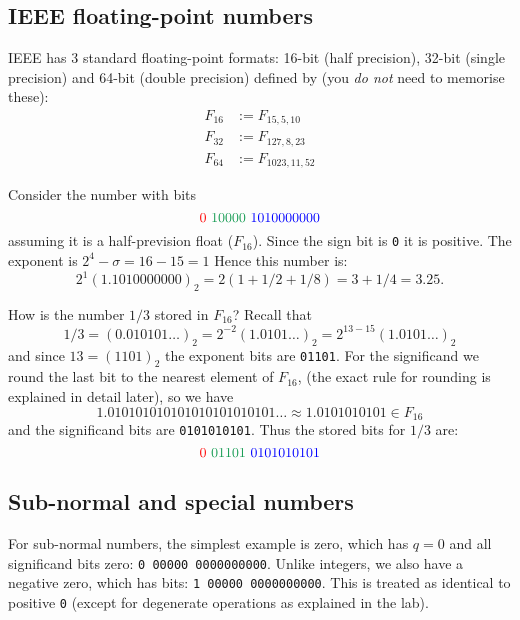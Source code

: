 \subsection{IEEE floating-point numbers}
\begin{definition}  IEEE has 3 standard floating-point formats: 16-bit (half precision), 32-bit (single precision) and 64-bit (double precision) defined by (you \emph{do not} need to memorise these):
\begin{align*}
F_{16} &:= F_{15,5,10} \\
F_{32} &:= F_{127,8,23} \\
F_{64} &:= F_{1023,11,52}
\end{align*}
\end{definition}

\begin{example} Consider the number with bits
\[
\red{0}\ \green{10000}\ \blue{1010000000}
\]
assuming it is a half-prevision float ($F_{16}$).  Since the sign bit is \texttt{0} it is positive. The exponent is $2^4 - \ensuremath{\sigma} = 16 - 15 = 1$ Hence this number is:
\[
2^1 (1.1010000000)_2 = 2 (1 + 1/2 + 1/8) = 3+1/4 = 3.25.
\]
\end{example}

\begin{example} How is the number $1/3$ stored in $F_{16}$? Recall that
\[
1/3 = (0.010101\ensuremath{\ldots})_2 = 2^{-2} (1.0101\ensuremath{\ldots})_2 = 2^{13-15} (1.0101\ensuremath{\ldots})_2
\]
and since $13 = (1101)_2$  the exponent bits are \texttt{01101}. For the significand we round the last bit to the nearest element of $F_{16}$,  (the exact rule for rounding is explained in detail later), so we have
\[
1.010101010101010101010101\ensuremath{\ldots}\approx 1.0101010101 \in F_{16} 
\]
and the significand bits are \texttt{0101010101}. Thus the stored bits for $1/3$ are:
\[
\red{0}\ \green{01101}\ \blue{0101010101}
\]
\end{example}

\subsection{Sub-normal and special numbers}
For sub-normal numbers, the simplest example is zero, which has $q=0$ and all significand bits zero: \texttt{0 00000 0000000000}. Unlike integers, we also have a negative zero, which has bits: \texttt{1 00000 0000000000}. This is treated as identical to positive \texttt{0} (except for degenerate operations as explained in the lab).


